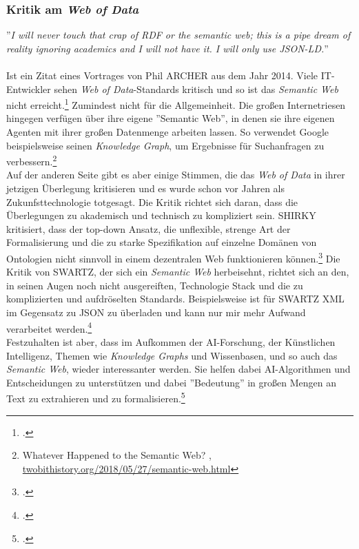 \documentclass[12pt,a4paper]{article}
\begin{document}
\subsubsection{Kritik am \textit{Web of Data}}

''\textit{I will never touch that crap of RDF or the semantic web; this is a pipe dream of reality ignoring academics and I will not have it. I will only use JSON-LD.}''
\\
\\
Ist ein Zitat eines Vortrages von Phil ARCHER aus dem Jahr 2014. Viele IT-Entwickler sehen \textit{Web of Data}-Standards kritisch und so ist das \textit{Semantic Web} nicht erreicht.\footcite{wettlaufer2018semanticwebEdition} Zumindest nicht für die Allgemeinheit. Die großen Internetriesen hingegen verfügen über ihre eigene ''Semantic Web'', in denen sie ihre eigenen Agenten mit ihrer großen Datenmenge arbeiten lassen. So verwendet Google beispielsweise seinen \textit{Knowledge Graph}, um Ergebnisse für Suchanfragen zu verbessern.\footnote{Whatever Happened to the Semantic Web? , \url{twobithistory.org/2018/05/27/semantic-web.html}}
\\
Auf der anderen Seite gibt es aber einige Stimmen, die das \textit{Web of Data} in ihrer jetzigen Überlegung kritisieren und es wurde schon vor Jahren als Zukunfsttechnologie totgesagt. Die Kritik richtet sich daran, dass die Überlegungen zu akademisch und technisch zu kompliziert sein. SHIRKY kritisiert, dass der top-down Ansatz, die unflexible, strenge Art der Formalisierung und die zu starke Spezifikation auf einzelne Domänen von Ontologien nicht sinnvoll in einem dezentralen Web funktionieren können.\footcite{shirky2005ontology} Die Kritik von SWARTZ, der sich ein \textit{Semantic Web} herbeisehnt, richtet sich an den, in seinen Augen noch nicht ausgereiften, Technologie Stack und die zu komplizierten und aufdröselten Standards. Beispielsweise ist für SWARTZ XML im Gegensatz zu JSON zu überladen und kann nur mir mehr Aufwand verarbeitet werden.\footcite{swartz2013aaron}
\\
Festzuhalten ist aber, dass im Aufkommen der AI-Forschung, der Künstlichen Intelligenz, Themen wie \textit{Knowledge Graphs} und Wissenbasen, und so auch das \textit{Semantic Web}, wieder interessanter werden. Sie helfen dabei AI-Algorithmen und Entscheidungen zu unterstützen und dabei ''Bedeutung'' in großen Mengen an Text zu extrahieren und zu formalisieren.\footcite[][]{bernstein2016new}
\end{document}
